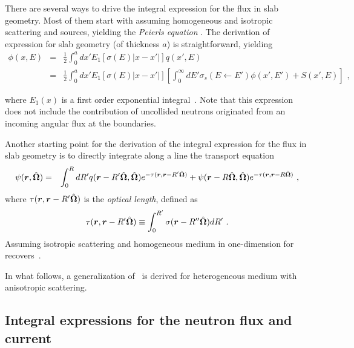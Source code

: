 There are several ways to drive the integral expression for the flux in slab geometry. Most of them start with assuming homogeneous and isotropic scattering and sources, yielding the \emph{Peierls equation} \cite{Davison-1957,Case-1967,Bell-1970,Pomraning-1973,Duderstadt-1979,Lewis-1984}. The derivation of expression for slab geometry (of thickness $a$) is straightforward, yielding
\begin{eqnarray}\label{eq:flux-slab-l-0-no-bndry-terms}
\phi(x,E)&=&\frac{1}{2}\int_0^a { dx'
	E_1\left[\sigma(E)\lvert x-x'\rvert\right] q(x',E) 
}\nonumber \\
&=& \frac{1}{2}\int_0^a { \!\!\! dx'
	E_1\left[\sigma(E)\lvert x-x'\rvert\right]
	\left[
	\int_0^\infty { \!\!\! dE'
		\sigma_s(E\leftarrow E')\phi(x',E') 
	} + S(x',E)
	\right] 
} \,\, ,
\end{eqnarray}

where $E_1(x)$ is a first order exponential integral~\cite{Abramowitz-1964}. Note that this expression does not include the contribution of uncollided neutrons originated from an incoming angular flux at the boundaries.

Another starting point for the derivation of the integral expression for the flux in slab geometry is to directly integrate along a line the transport equation~\cite{Davison-1957,Pomraning-1973,Duderstadt-1979,Lewis-1984}
\begin{eqnarray}\label{eq:full-ITE-w-bndry-terms}
\psi(\bm{r},\hat{\bm{\Omega}}) &=& \int_0^R { dR'
	q(\bm{r}-R'\hat{\bm{\Omega}},\hat{\bm{\Omega}}) e^{-\tau(\bm{r},\bm{r}-R'\hat{\bm{\Omega}})}
} 
+\psi(\bm{r}-R\hat{\bm{\Omega}},\hat{\bm{\Omega}}) e^{-\tau(\bm{r},\bm{r}-R\hat{\bm{\Omega}})}
\,\, ,
\end{eqnarray}
where $\tau(\bm{r},\bm{r}-R'\hat{\bm{\Omega}})$ is the \emph{optical length}, defined as
\begin{equation}\label{eq:opl}
\tau(\bm{r},\bm{r}-R'\hat{\bm{\Omega}}) \equiv 
\int_0^{R'} {\sigma(\bm{r}-R''\hat{\bm{\Omega}})dR'} \,\, .
\end{equation}
Assuming isotropic scattering and homogeneous medium in one-dimension for~ recovers~. 

In what follows, a generalization of~ is derived for heterogeneous medium with anisotropic scattering.  
%
\subsection{Integral expressions for the neutron flux and current}
\label{sec:int-flux-J}

